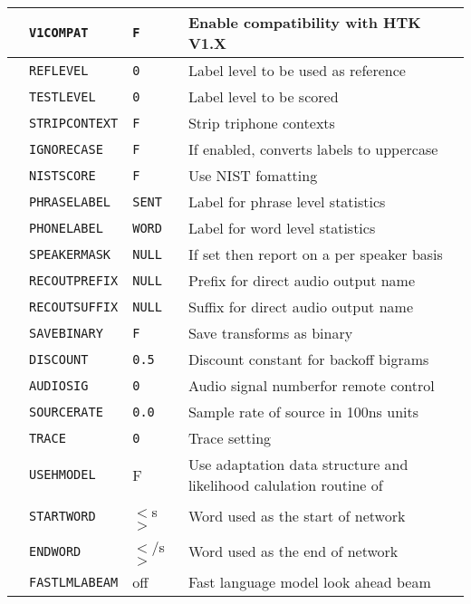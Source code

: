 \begin{center}
\begin{supertabular}{|p{1.8cm}|l|l|p{6.6cm}|}
 & \texttt{V1COMPAT} & \texttt{F} & Enable compatibility with HTK V1.X \\ \hline

  & \texttt{REFLEVEL} & \texttt{0} & Label level to be used as reference \\ 
  & \texttt{TESTLEVEL} & \texttt{0} & Label level to be scored \\ 
  & \texttt{STRIPCONTEXT} & \texttt{F} & Strip triphone contexts \\ 
 & \texttt{IGNORECASE} & \texttt{F} & If enabled,
  converts labels to uppercase \\ 
  & \texttt{NISTSCORE} & \texttt{F} & Use NIST fomatting \\ 
  & \texttt{PHRASELABEL} & \texttt{SENT} & Label for phrase level statistics \\ 
  & \texttt{PHONELABEL} & \texttt{WORD} & Label for word level statistics \\ 
  & \texttt{SPEAKERMASK} & \texttt{NULL} & If set then report on a per
  speaker basis \\ \hline 

  & \texttt{RECOUTPREFIX} & \texttt{NULL} & Prefix for direct
  audio output name \\ 
 & \texttt{RECOUTSUFFIX} & \texttt{NULL} & Suffix for direct audio output name\\ 
  & \texttt{SAVEBINARY} & \texttt{F} & Save transforms as binary \\ \hline

 & \texttt{DISCOUNT} & \texttt{0.5} & Discount constant
  for backoff bigrams\\ \hline

  & \texttt{AUDIOSIG} & \texttt{0} & Audio signal numberfor remote control 
  \\ 
  & \texttt{SOURCERATE} & \texttt{0.0} & Sample rate of source in 100ns units 
  \\ \hline

  & \texttt{TRACE} & \texttt{0} & Trace setting\\ \hline

& \texttt{USEHMODEL} & F & Use adaptation data structure and likelihood calulation routine of 
 \\
 & \texttt{STARTWORD} & $<$s$>$ & Word used as the start of network \\
 & \texttt{ENDWORD} & $<$/s$>$ & Word used as the end of network \\
 & \texttt{FASTLMLABEAM} & off & Fast language model look ahead beam \\\hline

\end{supertabular}
\end{center}
\clearpage


